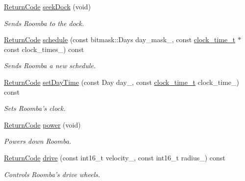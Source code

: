 \begin{DoxyCompactItemize}
\hyperlink{classroomba_1_1series500_1_1_open_interface_a43fc2ae1216e57cfb46901331b9ab4c7}{Return\+Code} \hyperlink{classroomba_1_1series500_1_1_open_interface_a45c9d9d77731030da42f9e3a337c45ed}{seek\+Dock} (void)
\begin{DoxyCompactList}\small\item\em Sends Roomba to the dock. \end{DoxyCompactList}\item 
\hyperlink{classroomba_1_1series500_1_1_open_interface_a43fc2ae1216e57cfb46901331b9ab4c7}{Return\+Code} \hyperlink{classroomba_1_1series500_1_1_open_interface_a9dcca64026dc1a9a563e90f0cfe97396}{schedule} (const bitmask\+::\+Days day\+\_\+mask\+\_\+, const \hyperlink{structroomba_1_1series500_1_1_open_interface_1_1clock__time__t}{clock\+\_\+time\+\_\+t} $\ast$const clock\+\_\+times\+\_\+) const 
\begin{DoxyCompactList}\small\item\em Sends Roomba a new schedule. \end{DoxyCompactList}\item 
\hyperlink{classroomba_1_1series500_1_1_open_interface_a43fc2ae1216e57cfb46901331b9ab4c7}{Return\+Code} \hyperlink{classroomba_1_1series500_1_1_open_interface_a68e09461fd2d7e3fbe20b1e70ea2a3a9}{set\+Day\+Time} (const Day day\+\_\+, const \hyperlink{structroomba_1_1series500_1_1_open_interface_1_1clock__time__t}{clock\+\_\+time\+\_\+t} clock\+\_\+time\+\_\+) const 
\begin{DoxyCompactList}\small\item\em Sets Roomba’s clock. \end{DoxyCompactList}\item 
\hyperlink{classroomba_1_1series500_1_1_open_interface_a43fc2ae1216e57cfb46901331b9ab4c7}{Return\+Code} \hyperlink{classroomba_1_1series500_1_1_open_interface_ae1abe0755730f35dd98d626c48d3f355}{power} (void)
\begin{DoxyCompactList}\small\item\em Powers down Roomba. \end{DoxyCompactList}\item 
\hyperlink{classroomba_1_1series500_1_1_open_interface_a43fc2ae1216e57cfb46901331b9ab4c7}{Return\+Code} \hyperlink{classroomba_1_1series500_1_1_open_interface_a54ef1ecc95d5df7aaa6646f0c1ce1bde}{drive} (const int16\+\_\+t velocity\+\_\+, const int16\+\_\+t radius\+\_\+) const 
\begin{DoxyCompactList}\small\item\em Controls Roomba’s drive wheels. \end{DoxyCompactList}\item 

\end{DoxyCompactItemize}
